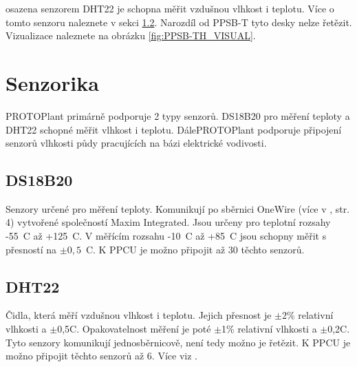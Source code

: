 \noindent{} osazena senzorem DHT22 \cite{DHT22} je schopna měřit vzdušnou vlhkost i teplotu.
Více o tomto senzoru naleznete v sekci \ref{sec:DHT22}.
Narozdíl od PPSB-T tyto desky nelze řetězit.
Vizualizace naleznete na obrázku \ref{fig:PPSB-TH_VISUAL}.\newline

\section{Senzorika}
PROTOPlant primárně podporuje 2 typy senzorů. 
DS18B20 pro měření teploty a DHT22 schopné měřit vlhkost i teplotu.
DálePROTOPlant podporuje připojení senzorů vlhkosti půdy pracujících na bázi elektrické vodivosti.

\subsection{DS18B20}
\label{sec:DS18B20}
Senzory určené pro měření teploty. 
Komunikují po sběrnici OneWire (více v \cite{DS18B20}, str. 4) vytvořené společností Maxim Integrated.
Jsou určeny pro teplotní rozsahy -55~\degree C až +125~\degree C.
V měřícím rozsahu -10~\degree C až +85~\degree C jsou schopny měřit s přesností na $\pm0,5$~\degree C.
K PPCU je možno připojit až 30 těchto senzorů.


\subsection{DHT22}
\label{sec:DHT22}
Čidla, která měří vzdušnou vlhkost i teplotu.
Jejich přesnost je $\pm2\%$ relativní vlhkosti a $\pm$0,5\degree C.
Opakovatelnost měření je poté $\pm$1\% relativní vlhkosti a $\pm$0,2\degree C.
Tyto senzory komunikují jednosběrnicově, není tedy možno je řetězit.
K PPCU je možno připojit těchto senzorů až 6.
Více viz \cite{DHT22}.

\newpage